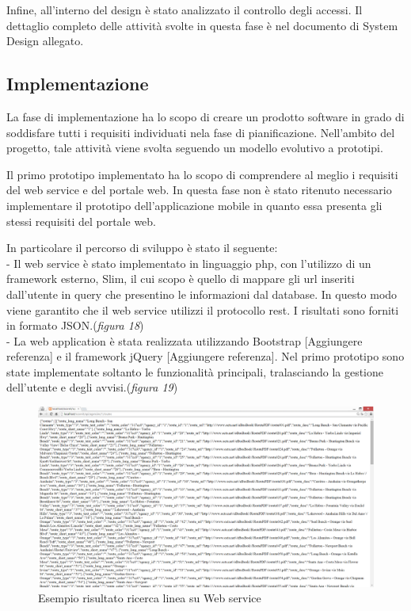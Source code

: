 Infine, all\rq interno del design \`{e} stato analizzato il controllo degli accessi. 
Il dettaglio completo delle attivit\`{a} svolte in questa fase \`{e} nel documento di System Design allegato.

\subsection{Implementazione}
La fase di implementazione ha lo scopo di creare un prodotto software in grado di soddisfare tutti i requisiti individuati nela fase di pianificazione. Nell'ambito del progetto, tale attivit\`{a} viene svolta seguendo un modello evolutivo a prototipi. 

Il primo prototipo implementato ha lo scopo di comprendere al meglio i requisiti del web service e del portale web. In questa fase non \`{e} stato ritenuto necessario implementare il prototipo dell\rq applicazione mobile in quanto essa presenta gli stessi requisiti del portale web. 

In particolare il percorso di sviluppo \`{e} stato il seguente:\\
- Il web service \`{e} stato implementato in linguaggio php, con l\rq utilizzo di un framework esterno, Slim, il cui scopo è quello di mappare gli url inseriti dall\rq utente in query che presentino le informazioni dal database. In questo modo viene garantito che il web service utilizzi il protocollo rest. I risultati sono forniti in formato JSON.(\emph{figura 18}) \\
- La web application \`{e} stata realizzata utilizzando Bootstrap [Aggiungere referenza] e il framework jQuery [Aggiungere referenza]. Nel primo prototipo sono state implementate soltanto le funzionalit\`{a} principali, tralasciando la gestione dell\rq utente e degli avvisi.(\emph{figura 19}) \\

\begin{figure}[tb]
\centering
\includegraphics[scale=.3]{img/19.png}
\caption{Esempio risultato ricerca linea su Web service }
\label{fig:mhs}
\end{figure} 


